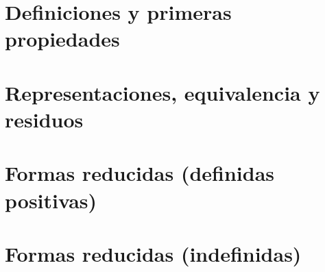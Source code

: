 \section{Definiciones y primeras propiedades}\label{sec:definiciones}


\section{Representaciones, equivalencia y residuos}\label{sec:representaciones}


\section{Formas reducidas (definidas positivas)}\label{sec:reducidas}


\section{Formas reducidas (indefinidas)}\label{sec:reducidas:indefinidas}


